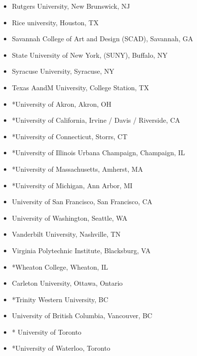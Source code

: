 \documentclass{report}
\begin{document}
\begin{itemize}
\item Rutgers University, New Brunswick, NJ
\item Rice university, Houston, TX
\item Savannah College of Art and Design (SCAD), Savannah, GA
\item State University of New York, (SUNY), Buffalo, NY
\item Syracuse University, Syracuse, NY
\item Texas AandM University, College Station, TX
\item *University of Akron, Akron, OH
\item *University of California, Irvine / Davis / Riverside, CA
\item *University of Connecticut, Storrs, CT
\item *University of Illinois Urbana Champaign, Champaign, IL
\item *University of Massachusetts, Amherst, MA
\item *University of Michigan, Ann Arbor, MI
\item University of San Francisco, San Francisco, CA
\item University of Washington, Seattle, WA
\item Vanderbilt University, Nashville, TN
\item Virginia Polytechnic Institute, Blacksburg, VA
\item *Wheaton College, Wheaton, IL
\end{itemize}


\begin{itemize}
\item Carleton University, Ottawa, Ontario
\item *Trinity Western University, BC
\item University of British Columbia, Vancouver, BC
\item * University of Toronto
\item *University of Waterloo, Toronto
\end{itemize}

\end{document}
